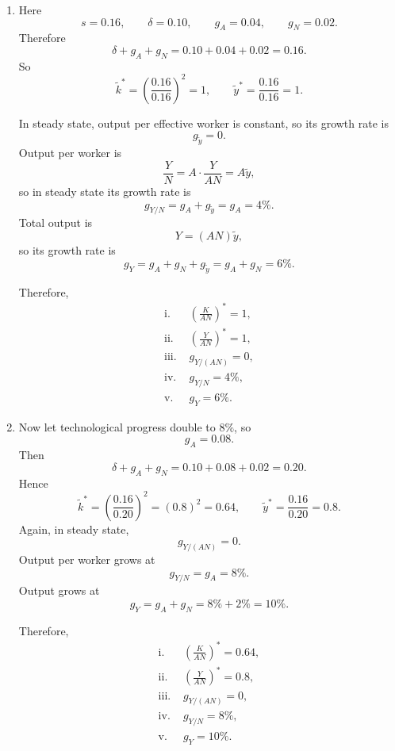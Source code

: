 \documentclass[12pt]{article}
\begin{document}
\begin{enumerate}[label=(\alph*)]
    \item
    Here
    \[
    s=0.16,\qquad \delta=0.10,\qquad g_A=0.04,\qquad g_N=0.02.
    \]
    Therefore
    \[
    \delta+g_A+g_N=0.10+0.04+0.02=0.16.
    \]
    So
    \[
    \tilde{k}^*=\left(\frac{0.16}{0.16}\right)^2=1,
    \qquad
    \tilde{y}^*=\frac{0.16}{0.16}=1.
    \]

    In steady state, output per effective worker is constant, so its growth rate is
    \[
    g_{\tilde{y}}=0.
    \]
    Output per worker is
    \[
    \frac{Y}{N}=A\cdot \frac{Y}{AN}=A\tilde{y},
    \]
    so in steady state its growth rate is
    \[
    g_{Y/N}=g_A+g_{\tilde{y}}=g_A=4\%.
    \]
    Total output is
    \[
    Y=(AN)\tilde{y},
    \]
    so its growth rate is
    \[
    g_Y=g_A+g_N+g_{\tilde{y}}=g_A+g_N=6\%.
    \]

    Therefore,
    \[
    \boxed{
    \begin{aligned}
    \text{i. } & \left(\frac{K}{AN}\right)^*=1,\\
    \text{ii. } & \left(\frac{Y}{AN}\right)^*=1,\\
    \text{iii. } & g_{Y/(AN)}=0,\\
    \text{iv. } & g_{Y/N}=4\%,\\
    \text{v. } & g_Y=6\%.
    \end{aligned}}
    \]

    \item
    Now let technological progress double to \(8\%\), so
    \[
    g_A=0.08.
    \]
    Then
    \[
    \delta+g_A+g_N=0.10+0.08+0.02=0.20.
    \]
    Hence
    \[
    \tilde{k}^*=\left(\frac{0.16}{0.20}\right)^2=(0.8)^2=0.64,
    \qquad
    \tilde{y}^*=\frac{0.16}{0.20}=0.8.
    \]
    Again, in steady state,
    \[
    g_{Y/(AN)}=0.
    \]
    Output per worker grows at
    \[
    g_{Y/N}=g_A=8\%.
    \]
    Output grows at
    \[
    g_Y=g_A+g_N=8\%+2\%=10\%.
    \]

    Therefore,
    \[
    \boxed{
    \begin{aligned}
    \text{i. } & \left(\frac{K}{AN}\right)^*=0.64,\\
    \text{ii. } & \left(\frac{Y}{AN}\right)^*=0.8,\\
    \text{iii. } & g_{Y/(AN)}=0,\\
    \text{iv. } & g_{Y/N}=8\%,\\
    \text{v. } & g_Y=10\%.
    \end{aligned}}
    \]


\end{enumerate}
\end{document}
